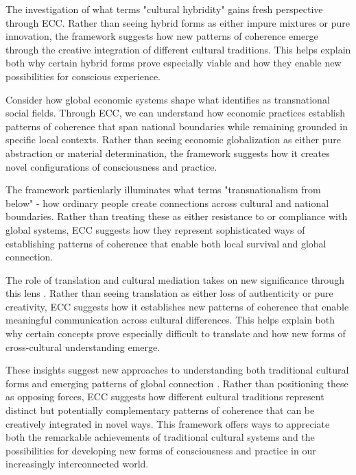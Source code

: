 The investigation of what \cite{kraidy2005hybridity} terms "cultural hybridity" gains fresh perspective through ECC. Rather than seeing hybrid forms as either impure mixtures or pure innovation, the framework suggests how new patterns of coherence emerge through the creative integration of different cultural traditions. This helps explain both why certain hybrid forms prove especially viable and how they enable new possibilities for conscious experience.

Consider how global economic systems shape what \cite{sassen2007sociology} identifies as transnational social fields. Through ECC, we can understand how economic practices establish patterns of coherence that span national boundaries while remaining grounded in specific local contexts. Rather than seeing economic globalization as either pure abstraction or material determination, the framework suggests how it creates novel configurations of consciousness and practice.

The framework particularly illuminates what \cite{vertovec2009transnationalism} terms "transnationalism from below" - how ordinary people create connections across cultural and national boundaries. Rather than treating these as either resistance to or compliance with global systems, ECC suggests how they represent sophisticated ways of establishing patterns of coherence that enable both local survival and global connection.

The role of translation and cultural mediation takes on new significance through this lens \cite{tomlinson1999globalization}. Rather than seeing translation as either loss of authenticity or pure creativity, ECC suggests how it establishes new patterns of coherence that enable meaningful communication across cultural differences. This helps explain both why certain concepts prove especially difficult to translate and how new forms of cross-cultural understanding emerge.

These insights suggest new approaches to understanding both traditional cultural forms and emerging patterns of global connection \cite{appadurai1996modernity}. Rather than positioning these as opposing forces, ECC suggests how different cultural traditions represent distinct but potentially complementary patterns of coherence that can be creatively integrated in novel ways. This framework offers ways to appreciate both the remarkable achievements of traditional cultural systems and the possibilities for developing new forms of consciousness and practice in our increasingly interconnected world.